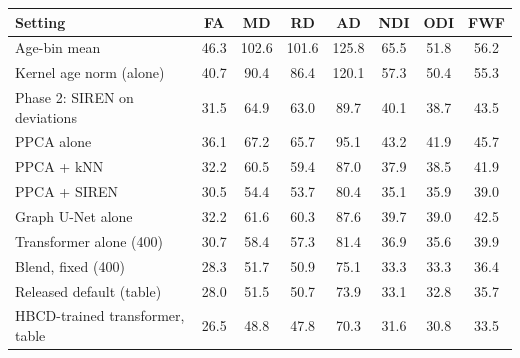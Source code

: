\begin{tabular}{lccccccc}
\toprule
Setting & FA & MD & RD & AD & NDI & ODI & FWF \\
\midrule
Age-bin mean & 46.3 & 102.6 & 101.6 & 125.8 & 65.5 & 51.8 & 56.2 \\
Kernel age norm (alone) & 40.7 & 90.4 & 86.4 & 120.1 & 57.3 & 50.4 & 55.3 \\
Phase 2: SIREN on deviations & 31.5 & 64.9 & 63.0 & 89.7 & 40.1 & 38.7 & 43.5 \\
PPCA alone & 36.1 & 67.2 & 65.7 & 95.1 & 43.2 & 41.9 & 45.7 \\
PPCA + kNN & 32.2 & 60.5 & 59.4 & 87.0 & 37.9 & 38.5 & 41.9 \\
PPCA + SIREN & 30.5 & 54.4 & 53.7 & 80.4 & 35.1 & 35.9 & 39.0 \\
Graph U-Net alone & 32.2 & 61.6 & 60.3 & 87.6 & 39.7 & 39.0 & 42.5 \\
Transformer alone (400) & 30.7 & 58.4 & 57.3 & 81.4 & 36.9 & 35.6 & 39.9 \\
Blend, fixed (400) & 28.3 & 51.7 & 50.9 & 75.1 & 33.3 & 33.3 & 36.4 \\
Released default (table) & 28.0 & 51.5 & 50.7 & 73.9 & 33.1 & 32.8 & 35.7 \\
HBCD-trained transformer, table & 26.5 & 48.8 & 47.8 & 70.3 & 31.6 & 30.8 & 33.5 \\
\bottomrule
\end{tabular}

